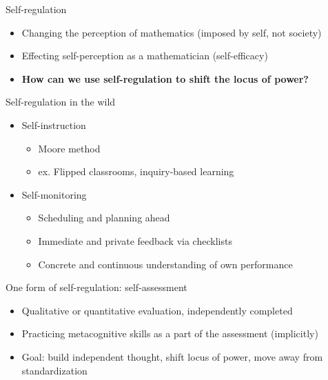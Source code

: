 \documentclass{beamer}
\begin{document}
\begin{frame}{Self-regulation}
  \begin{itemize}
    \item Changing the perception of mathematics (imposed by self, not society)
    \item Effecting self-perception as a mathematician (self-efficacy)
    \item {\bf How can we use self-regulation to shift the locus of power?}
  \end{itemize}
\end{frame}
\begin{frame}{Self-regulation in the wild}
  \begin{itemize}
    \item Self-instruction
    \begin{itemize}
      \item Moore method
      \item ex. Flipped classrooms, inquiry-based learning
    \end{itemize}
    \item Self-monitoring
    \begin{itemize}
      \item Scheduling and planning ahead
      \item Immediate and private feedback via checklists
      \item Concrete and continuous understanding of own performance
    \end{itemize}
  \end{itemize}
\end{frame}
\begin{frame}{One form of self-regulation: self-assessment}
  \begin{itemize}
    \item Qualitative or quantitative evaluation, independently completed
    \item Practicing metacognitive skills as a part of the assessment (implicitly) \pause
    \item Goal: build independent thought, shift locus of power, move away from standardization
  \end{itemize}
\end{frame}
\end{document}
